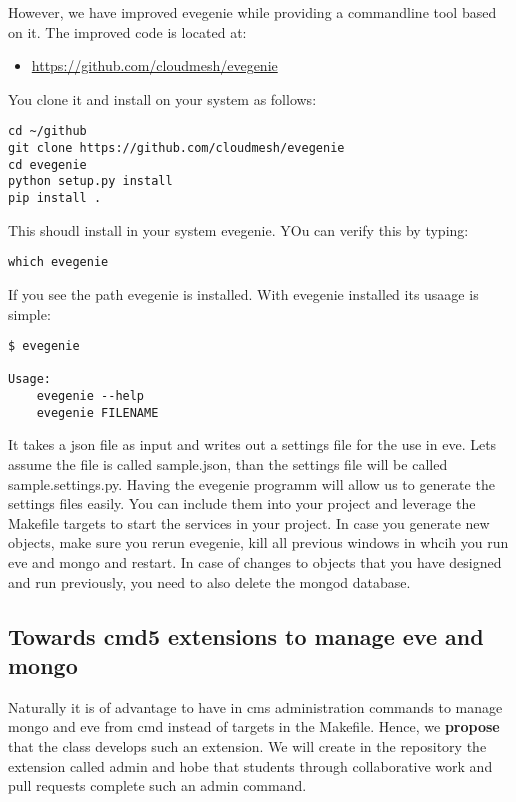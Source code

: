 However, we have improved evegenie while providing a commandline tool
based on it. The improved code is located at:

\begin{itemize}
\tightlist
\item
  \url{https://github.com/cloudmesh/evegenie}
\end{itemize}

You clone it and install on your system as follows:

\begin{verbatim}
cd ~/github
git clone https://github.com/cloudmesh/evegenie
cd evegenie
python setup.py install
pip install .
\end{verbatim}

This shoudl install in your system evegenie. YOu can verify this by
typing:

\begin{verbatim}
which evegenie
\end{verbatim}

If you see the path evegenie is installed. With evegenie installed its
usaage is simple:

\begin{verbatim}
$ evegenie

Usage:
    evegenie --help
    evegenie FILENAME
\end{verbatim}

It takes a json file as input and writes out a settings file for the use
in eve. Lets assume the file is called sample.json, than the settings
file will be called sample.settings.py. Having the evegenie programm
will allow us to generate the settings files easily. You can include
them into your project and leverage the Makefile targets to start the
services in your project. In case you generate new objects, make sure
you rerun evegenie, kill all previous windows in whcih you run eve and
mongo and restart. In case of changes to objects that you have designed
and run previously, you need to also delete the mongod database.

\subsection{Towards cmd5 extensions to manage eve and
mongo}\label{towards-cmd5-extensions-to-manage-eve-and-mongo}

Naturally it is of advantage to have in cms administration commands to
manage mongo and eve from cmd instead of targets in the Makefile. Hence,
we \textbf{propose} that the class develops such an extension. We will
create in the repository the extension called admin and hobe that
students through collaborative work and pull requests complete such an
admin command.

